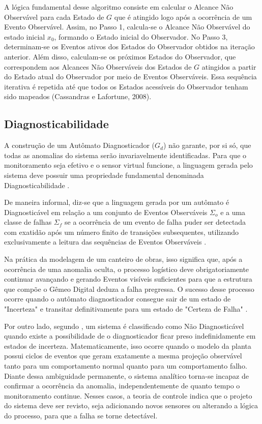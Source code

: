 A lógica fundamental desse algoritmo consiste em calcular o Alcance Não Observável para cada Estado de $G$ que é atingido logo após a ocorrência de um Evento Observável. Assim, no Passo 1, calcula-se o Alcance Não Observável do estado inicial $x_0$, formando o Estado inicial do Observador. No Passo 3, determinam-se os Eventos ativos dos Estados do Observador obtidos na iteração anterior. Além disso, calculam-se os próximos Estados do Observador, que correspondem aos Alcances Não Observáveis dos Estados de $G$ atingidos a partir do Estado atual do Observador por meio de Eventos Observáveis. Essa sequência iterativa é repetida até que todos os Estados acessíveis do Observador tenham sido mapeados (Cassandras e Lafortune, 2008).

\subsection{Diagnosticabilidade}
\label{subsec:diagnosticabilidade}

A construção de um Autômato Diagnosticador ($G_d$) não garante, por si só, que todas as anomalias do sistema serão invariavelmente identificadas. Para que o monitoramento seja efetivo e o sensor virtual funcione, a linguagem gerada pelo sistema deve possuir uma propriedade fundamental denominada Diagnosticabilidade \cite{basilio2010}.

De maneira informal, diz-se que a linguagem gerada por um autômato é Diagnosticável em relação a um conjunto de Eventos Observáveis $\Sigma_o$ e a uma classe de falhas $\Sigma_f$ se a ocorrência de um evento de falha puder ser detectada com exatidão após um número finito de transições subsequentes, utilizando exclusivamente a leitura das sequências de Eventos Observáveis \cite{basilio2010}.

Na prática da modelagem de um canteiro de obras, isso significa que, após a ocorrência de uma anomalia oculta, o processo logístico deve obrigatoriamente continuar avançando e gerando Eventos visíveis suficientes para que a estrutura que compõe o Gêmeo Digital deduza a falha pregressa. O sucesso desse processo ocorre quando o autômato diagnosticador consegue sair de um estado de "Incerteza" e transitar definitivamente para um estado de "Certeza de Falha" \cite{basilio2010}.

Por outro lado, segundo , um sistema é classificado como Não Diagnosticável quando existe a possibilidade de o diagnosticador ficar preso indefinidamente em estados de incerteza. Matematicamente, isso ocorre quando o modelo da planta possui ciclos de eventos que geram exatamente a mesma projeção observável tanto para um comportamento normal quanto para um comportamento falho. Diante dessa ambiguidade permanente, o sistema analítico torna-se incapaz de confirmar a ocorrência da anomalia, independentemente de quanto tempo o monitoramento continue. Nesses casos, a teoria de controle indica que o projeto do sistema deve ser revisto, seja adicionando novos sensores ou alterando a lógica do processo, para que a falha se torne detectável.



